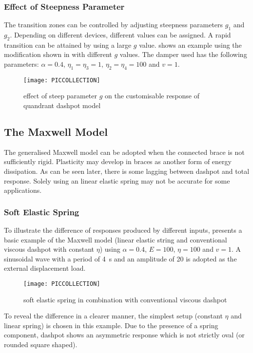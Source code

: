 \subsubsection{Effect of Steepness Parameter}
The transition zones can be controlled by adjusting steepness parameters $g_1$ and $g_2$. Depending on different devices, different values can be assigned. A rapid transition can be attained by using a large $g$ value.  shows an example using the modification shown in  with different $g$ values. The damper used has the following parameters: $\alpha=0.4$, $\eta_1=\eta_3=1$, $\eta_2=\eta_4=100$ and $v=1$.
\begin{figure}[htb]
\centering\scriptsize
\texttt{[image: PICCOLLECTION]}
\caption{effect of steep parameter $g$ on the customisable response of quandrant dashpot model}\label{fig:steep}
\end{figure}
\subsection{The Maxwell Model}
The generalised Maxwell model can be adopted when the connected brace is not sufficiently rigid. Plasticity may develop in braces as another form of energy dissipation. As can be seen later, there is some lagging between dashpot and total response. Solely using an linear elastic spring may not be accurate for some applications.
\subsubsection{Soft Elastic Spring}
To illustrate the difference of responses produced by different inputs,  presents a basic example of the Maxwell model (linear elastic string and conventional viscous dashpot with constant $\eta$) using $\alpha=0.4$, $E=100$, $\eta=100$ and $v=1$. A sinusoidal wave with a period of \SI{4}{\second} and an amplitude of \num{20} is adopted as the external displacement load.
\begin{figure}[htb]
\centering\scriptsize
\texttt{[image: PICCOLLECTION]}
\caption{soft elastic spring in combination with conventional viscous dashpot}\label{fig:maxwell_sep}
\end{figure}
To reveal the difference in a clearer manner, the simplest setup (constant $\eta$ and linear spring) is chosen in this example. Due to the presence of a spring component, dashpot shows an asymmetric response which is not strictly oval (or rounded square shaped).

